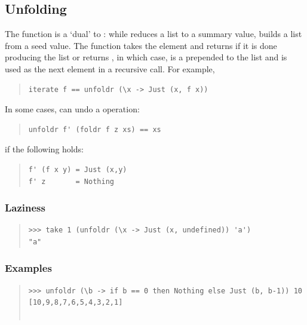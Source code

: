 \subsection{Unfolding}
\begin{haddockdesc}
\item[\begin{tabular}{@{}l}
unfoldr :: (b -> Maybe (a, b)) -> b -> {\char 91}a{\char 93}
\end{tabular}]
{\haddockbegindoc
The  function is a `dual' to : while 
 reduces a list to a summary value,  builds a list from
 a seed value.  The function takes the element and returns 
 if it is done producing the list or returns  , in which
 case,  is a prepended to the list and  is used as the next
 element in a recursive call.  For example,\par
\begin{quote}
{\haddockverb\begin{verbatim}
iterate f == unfoldr (\x -> Just (x, f x))\end{verbatim}}
\end{quote}
In some cases,  can undo a  operation:\par
\begin{quote}
{\haddockverb\begin{verbatim}
unfoldr f' (foldr f z xs) == xs\end{verbatim}}
\end{quote}
if the following holds:\par
\begin{quote}
{\haddockverb\begin{verbatim}
f' (f x y) = Just (x,y)
f' z       = Nothing\end{verbatim}}
\end{quote}
\subsubsection*{\textbf{Laziness}}
\begin{quote}
{\haddockverb\begin{verbatim}
>>> take 1 (unfoldr (\x -> Just (x, undefined)) 'a')
"a"

\end{verbatim}}
\end{quote}
\subsubsection*{\textbf{Examples}}
\begin{quote}
{\haddockverb\begin{verbatim}
>>> unfoldr (\b -> if b == 0 then Nothing else Just (b, b-1)) 10
[10,9,8,7,6,5,4,3,2,1]


\end{verbatim}}
\end{quote}}
\end{haddockdesc}
